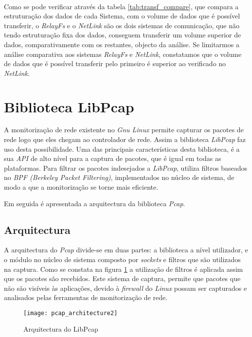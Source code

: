 \paragraph*{}
Como se pode verificar através da tabela \ref{tab:transf_compare}, que compara a estruturação dos dados de cada Sistema, com o volume de dados que é possível transferir, o \textit{RelayFs} e o \textit{NetLink} são os dois sistemas de comunicação, que não tendo estruturação fixa dos dados, conseguem transferir um volume superior de dados, comparativamente com os restantes, objecto da análise.
Se limitarmos a análise comparativa aos sistemas \textit{RelayFs} e \textit{NetLink}, constatamos que o volume de dados que é possível transferir pelo primeiro é superior ao verificado no \textit{NetLink}.

\section{Biblioteca LibPcap}\label{sect:LibPcap}

A monitorização de rede existente no \textit{Gnu Linux} permite capturar os pacotes de rede logo que eles chegam ao controlador de rede.
Assim a biblioteca \textit{LibPcap}\cite{:LibPcap} faz uso desta possibilidade.
Uma das principais características desta biblioteca, é a sua \textit{API} de alto nível para a captura de pacotes, que é igual em todas as plataformas.
Para filtrar os pacotes indesejados a \textit{LibPcap}, utiliza filtros baseados no \textit{BPF (Berkeley Packet Filtering)}, implementados no núcleo de sistema, de modo a que a monitorização se torne mais eficiente.

Em seguida é apresentada a arquitectura da biblioteca \textit{Pcap}.

\subsection {Arquitectura}
\label{sect:architecture_libpcap}
A arquitectura do \textit{Pcap} divide-se em duas partes: a biblioteca a nível utilizador, e o módulo no núcleo de sistema composto por \textit{sockets} e filtros que são utilizados na captura.
Como se constata na figura \ref{fig:pcap_architecture} a utilização de filtros é aplicada assim que os pacotes são recebidos.
Este sistema de captura, permite que pacotes que não são visíveis às aplicações, devido à \textit{firewall} do \textit{Linux} possam ser capturados e analisados pelas ferramentas de monitorização de rede.

\begin{figure}[h]
       \centering
       \texttt{[image: pcap\_architecture2]}
       \caption{Arquitectura do LibPcap}
      \label{fig:pcap_architecture}
\end{figure}

